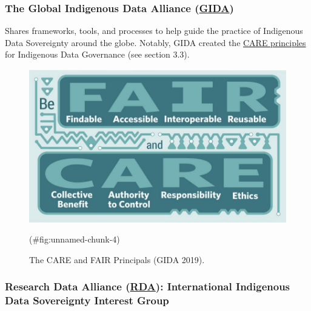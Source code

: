 \documentclass[
]{book}
\begin{document}
\hypertarget{the-global-indigenous-data-alliance-gida}{%
\subsubsection*{\texorpdfstring{The Global Indigenous Data Alliance (\href{https://www.gida-global.org/}{GIDA})}{The Global Indigenous Data Alliance (GIDA)}}\label{the-global-indigenous-data-alliance-gida}}

Shares frameworks, tools, and processes to help guide the practice of Indigenous Data Sovereignty around the globe.
Notably, GIDA created the \href{https://www.gida-global.org/care}{CARE principles} for Indigenous Data Governance (see section 3.3).

\begin{figure}
\includegraphics[width=12.44in]{images/care_fair} \caption{The CARE and FAIR Principals (GIDA 2019).}(\#fig:unnamed-chunk-4)
\end{figure}

\hypertarget{research-data-alliance-rda-international-indigenous-data-sovereignty-interest-group}{%
\subsubsection*{\texorpdfstring{Research Data Alliance (\href{https://www.rd-alliance.org/groups/international-indigenous-data-sovereignty-ig}{RDA}): International Indigenous Data Sovereignty Interest Group}{Research Data Alliance (RDA): International Indigenous Data Sovereignty Interest Group}}\label{research-data-alliance-rda-international-indigenous-data-sovereignty-interest-group}}
\end{document}
